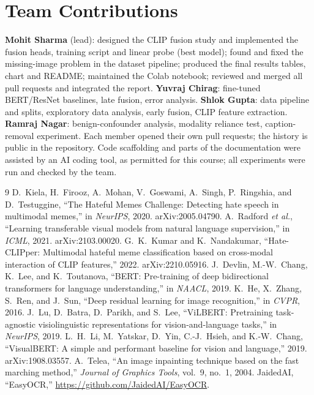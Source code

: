 \documentclass[conference]{IEEEtran}
\begin{document}
\section*{Team Contributions}
\noindent\textbf{Mohit Sharma} (lead): designed the CLIP fusion study and implemented the fusion heads, training
script and linear probe (best model); found and fixed the missing-image problem in the dataset pipeline; produced
the final results tables, chart and README; maintained the Colab notebook; reviewed and merged all pull requests
and integrated the report.
\textbf{Yuvraj Chirag}: fine-tuned BERT/ResNet baselines, late fusion, error analysis.
\textbf{Shlok Gupta}: data pipeline and splits, exploratory data analysis, early fusion, CLIP feature extraction.
\textbf{Ramraj Nagar}: benign-confounder analysis, modality reliance test, caption-removal experiment.
Each member opened their own pull requests; the history is public in the repository.
Code scaffolding and parts of the documentation were assisted by an AI coding tool, as permitted for this course;
all experiments were run and checked by the team.

\begin{thebibliography}{9}
 D.~Kiela, H.~Firooz, A.~Mohan, V.~Goswami, A.~Singh, P.~Ringshia, and D.~Testuggine, ``The Hateful
Memes Challenge: Detecting hate speech in multimodal memes,'' in \emph{NeurIPS}, 2020. arXiv:2005.04790.
 A.~Radford \emph{et al.}, ``Learning transferable visual models from natural language
supervision,'' in \emph{ICML}, 2021. arXiv:2103.00020.
 G.~K.~Kumar and K.~Nandakumar, ``Hate-CLIPper: Multimodal hateful meme classification based on
cross-modal interaction of CLIP features,'' 2022. arXiv:2210.05916.
 J.~Devlin, M.-W.~Chang, K.~Lee, and K.~Toutanova, ``BERT: Pre-training of deep bidirectional
transformers for language understanding,'' in \emph{NAACL}, 2019.
 K.~He, X.~Zhang, S.~Ren, and J.~Sun, ``Deep residual learning for image recognition,'' in
\emph{CVPR}, 2016.
 J.~Lu, D.~Batra, D.~Parikh, and S.~Lee, ``ViLBERT: Pretraining task-agnostic visiolinguistic
representations for vision-and-language tasks,'' in \emph{NeurIPS}, 2019.
 L.~H.~Li, M.~Yatskar, D.~Yin, C.-J.~Hsieh, and K.-W.~Chang, ``VisualBERT: A simple and
performant baseline for vision and language,'' 2019. arXiv:1908.03557.
 A.~Telea, ``An image inpainting technique based on the fast marching method,'' \emph{Journal of
Graphics Tools}, vol.~9, no.~1, 2004.
 JaidedAI, ``EasyOCR,'' \url{https://github.com/JaidedAI/EasyOCR}.
\end{thebibliography}
\end{document}
